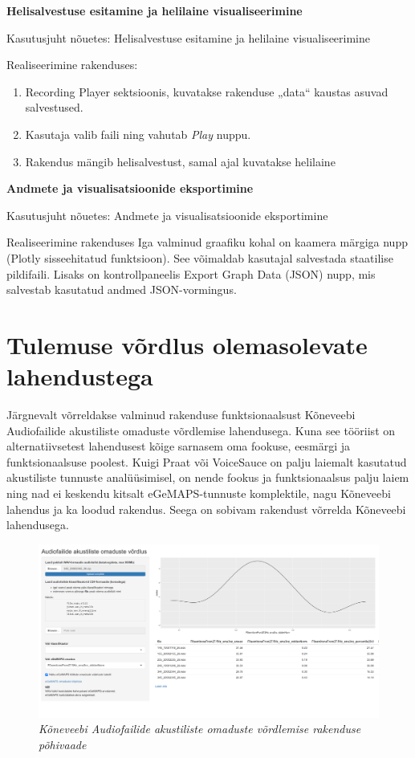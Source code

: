 \textbf{Helisalvestuse esitamine ja helilaine visualiseerimine
}

Kasutusjuht nõuetes: Helisalvestuse esitamine ja helilaine visualiseerimine

Realiseerimine rakenduses:
\begin{enumerate}
    \item Recording Player sektsioonis, kuvatakse rakenduse „data“ kaustas asuvad salvestused.
    \item Kasutaja valib faili ning vahutab \textit{Play} nuppu.
    \item Rakendus mängib helisalvestust, samal ajal kuvatakse helilaine
\end{enumerate}

\textbf{Andmete ja visualisatsioonide eksportimine}

Kasutusjuht nõuetes: Andmete ja visualisatsioonide eksportimine

Realiseerimine rakenduses
Iga valminud graafiku kohal on kaamera märgiga nupp (Plotly sisseehitatud funktsioon). See võimaldab kasutajal salvestada staatilise pildifaili.
Lisaks on kontrollpaneelis Export Graph Data (JSON) nupp, mis salvestab kasutatud andmed JSON-vormingus.

\section{Tulemuse võrdlus olemasolevate lahendustega}
Järgnevalt võrreldakse valminud rakenduse funktsionaalsust Kõneveebi Audiofailide akustiliste omaduste võrdlemise lahendusega. Kuna see tööriist on alternatiivsetest lahendusest kõige sarnasem oma fookuse, eesmärgi ja funktsionaalsuse poolest. Kuigi Praat või VoiceSauce on palju laiemalt kasutatud akustiliste tunnuste analüüsimisel, on nende fookus ja funktsionaalsus palju laiem ning nad ei keskendu kitsalt eGeMAPS-tunnuste komplektile, nagu Kõneveebi lahendus ja ka loodud rakendus. Seega on sobivam rakendust võrrelda Kõneveebi lahendusega.

\begin{figure}[H]
    \centering
    \includegraphics[width=\textwidth]{figures/alt-kõneveeb-põhivaade.png}
    \caption{\textit{Kõneveebi Audiofailide akustiliste omaduste võrdlemise rakenduse põhivaade}}
    \label{fig:alt-kõneveeb-põhivaade}
\end{figure}


